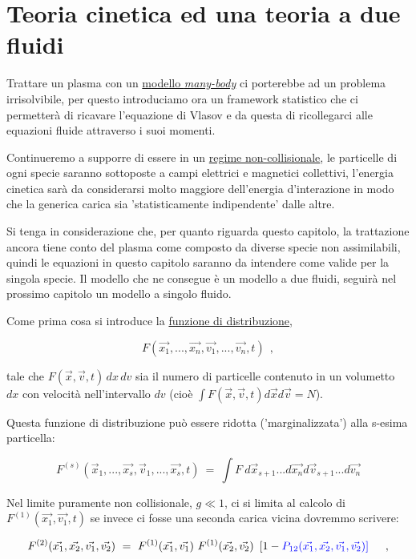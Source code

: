\chapter{Teoria cinetica ed una teoria a due fluidi}

Trattare un plasma con un \underline{modello \emph{many-body}} ci porterebbe ad un problema irrisolvibile, per questo introduciamo ora un framework statistico che ci permetterà di ricavare l'equazione di Vlasov e da questa di ricollegarci alle equazioni fluide attraverso i suoi momenti.

Continueremo a supporre di essere in un \underline{regime non-collisionale}, le particelle di ogni specie saranno sottoposte a campi elettrici e magnetici collettivi, l'energia cinetica sarà da considerarsi molto maggiore dell'energia d'interazione in modo che la generica carica sia 'statisticamente indipendente' dalle altre. 

Si tenga in considerazione che, per quanto riguarda questo capitolo, la trattazione ancora tiene conto del plasma come composto da diverse specie non assimilabili, quindi le equazioni in questo capitolo saranno da intendere come valide per la singola specie. Il modello che ne consegue è un modello a due fluidi, seguirà nel prossimo capitolo un modello a singolo fluido.  

Come prima cosa si introduce la \underline{funzione di distribuzione},

\[F(\vec{x_1}, ...,\vec{x_n}, \vec{v_1}, ...,\vec{v_n}, t)\ \   ,\]

tale che $F(\vec{x}, \vec{v}, t)\, dx\, dv$ sia il numero di particelle contenuto in un volumetto $dx$ con velocità nell'intervallo $dv$ (cioè $\int F(\vec x, \vec v, t) d\vec x d\vec v = N$).

Questa funzione di distribuzione può essere ridotta ('marginalizzata') alla s-esima particella: 

\[ F^{(s)}(\vec{x}_{1}, ...,\vec{x_s}, \vec{v}_{1}, ...,\vec{x_s}, t) \ =\ \int F\ d\vec{x}_{s+1} ...d\vec{x_n} d\vec{v}_{s+1} ...d\vec{v_n}\]

Nel limite puramente non collisionale, $g\ll 1$, ci si limita al calcolo di $F^{(1)}(\vec{x_1}, \vec{v_1}, t)$ se invece ci fosse una seconda carica vicina dovremmo scrivere:

\[ F^{(2)}(\vec{x_1}, \vec{x_2}, \vec{v_1}, \vec{v_2})\ =\ F^{(1)}(\vec{x_1}, \vec{v_1})\ F^{(1)}(\vec{x_2}, \vec{v_2}) \ \left[ 1-\color{blue}{P_{12}(\vec{x_1}, \vec{x_2}, \vec{v_1}, \vec{v_2})}\right]\ \ \ \ ,\]

